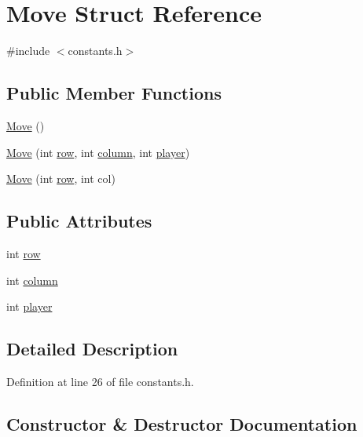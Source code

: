 \hypertarget{struct_move}{}\section{Move Struct Reference}
\label{struct_move}


{\ttfamily \#include $<$constants.\+h$>$}

\subsection*{Public Member Functions}
\begin{DoxyCompactItemize}
\item 
\hyperlink{struct_move_a4b1acc3a67d30c385ad9a6000526393a}{Move} ()
\item 
\hyperlink{struct_move_aa1dd034928b13fc8a02f48bfa10f44e8}{Move} (int \hyperlink{struct_move_a078eb7da4c5a1bd0b9810453b1c25036}{row}, int \hyperlink{struct_move_a36503ec622ed1932790f7a6885ec37d3}{column}, int \hyperlink{struct_move_ad96c39b901881ab1e2e6ab59b994a815}{player})
\item 
\hyperlink{struct_move_ad8cc48006b681c9517082101d2d0c5c5}{Move} (int \hyperlink{struct_move_a078eb7da4c5a1bd0b9810453b1c25036}{row}, int col)
\end{DoxyCompactItemize}
\subsection*{Public Attributes}
\begin{DoxyCompactItemize}
\item 
int \hyperlink{struct_move_a078eb7da4c5a1bd0b9810453b1c25036}{row}
\item 
int \hyperlink{struct_move_a36503ec622ed1932790f7a6885ec37d3}{column}
\item 
int \hyperlink{struct_move_ad96c39b901881ab1e2e6ab59b994a815}{player}
\end{DoxyCompactItemize}


\subsection{Detailed Description}


Definition at line 26 of file constants.\+h.



\subsection{Constructor \& Destructor Documentation}
\mbox{\label{struct_move_a4b1acc3a67d30c385ad9a6000526393a}} 
